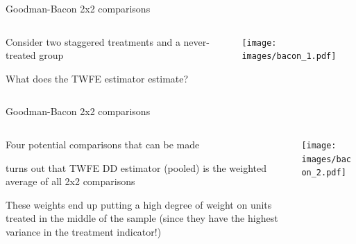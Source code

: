 \documentclass[notes,11pt, aspectratio=169]{beamer}
\newenvironment{wideitemize}{\itemize\addtolength{\itemsep}{10pt}}{\enditemize}
\begin{document}
\begin{frame}{Goodman-Bacon 2x2 comparisons}
  \begin{columns}[T] %
    \begin{column}{0.4\textwidth}
      \begin{wideitemize}
      \item  Consider two staggered treatments and a never-treated group
      \item What does the TWFE estimator estimate?
      \end{wideitemize}
    \end{column}%
    \hfill%
    \begin{column}{.6\textwidth}
      \texttt{[image: images/bacon\_1.pdf]}
    \end{column}%
  \end{columns}
\end{frame}
\begin{frame}{Goodman-Bacon 2x2 comparisons}
  \begin{columns}[T] %
    \begin{column}{0.4\textwidth}
      \begin{wideitemize}
      \item Four potential comparisons that can be made
      \item turns out that TWFE DD estimator (pooled) is the 
        weighted average of all 2x2 comparisons
      \item These weights end up putting a high degree of weight on
        units treated in the middle of the sample (since they have the
        highest variance in the treatment indicator!)
      \end{wideitemize}
    \end{column}%
    \hfill%
    \begin{column}{.6\textwidth}
      \texttt{[image: images/bacon\_2.pdf]}
    \end{column}%
  \end{columns}
\end{frame}
\end{document}

